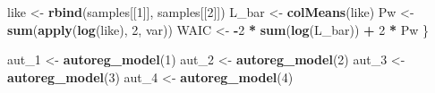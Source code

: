 \documentclass[
]{article}
\newenvironment{Shaded}{\begin{snugshade}}{\end{snugshade}}
\newcommand{\DecValTok}[1]{\textcolor[rgb]{0.00,0.00,0.81}{#1}}
\newcommand{\FunctionTok}[1]{\textcolor[rgb]{0.13,0.29,0.53}{\textbf{#1}}}
\newcommand{\NormalTok}[1]{#1}
\newcommand{\OtherTok}[1]{\textcolor[rgb]{0.56,0.35,0.01}{#1}}
\newcommand{\SpecialCharTok}[1]{\textcolor[rgb]{0.81,0.36,0.00}{\textbf{#1}}}
\begin{document}
\begin{Shaded}
\begin{Highlighting}[]
\NormalTok{  like  }\OtherTok{\textless{}{-}} \FunctionTok{rbind}\NormalTok{(samples[[}\DecValTok{1}\NormalTok{]], samples[[}\DecValTok{2}\NormalTok{]])}
\NormalTok{  L\_bar }\OtherTok{\textless{}{-}} \FunctionTok{colMeans}\NormalTok{(like)}
\NormalTok{  Pw    }\OtherTok{\textless{}{-}} \FunctionTok{sum}\NormalTok{(}\FunctionTok{apply}\NormalTok{(}\FunctionTok{log}\NormalTok{(like), }\DecValTok{2}\NormalTok{, var))}
\NormalTok{  WAIC }\OtherTok{\textless{}{-}} \SpecialCharTok{{-}}\DecValTok{2} \SpecialCharTok{*} \FunctionTok{sum}\NormalTok{(}\FunctionTok{log}\NormalTok{(L\_bar)) }\SpecialCharTok{+} \DecValTok{2} \SpecialCharTok{*}\NormalTok{ Pw}
\NormalTok{\}}

\NormalTok{aut\_1 }\OtherTok{\textless{}{-}} \FunctionTok{autoreg\_model}\NormalTok{(}\DecValTok{1}\NormalTok{)}
\NormalTok{aut\_2 }\OtherTok{\textless{}{-}} \FunctionTok{autoreg\_model}\NormalTok{(}\DecValTok{2}\NormalTok{)}
\NormalTok{aut\_3 }\OtherTok{\textless{}{-}} \FunctionTok{autoreg\_model}\NormalTok{(}\DecValTok{3}\NormalTok{)}
\NormalTok{aut\_4 }\OtherTok{\textless{}{-}} \FunctionTok{autoreg\_model}\NormalTok{(}\DecValTok{4}\NormalTok{)}
\end{Highlighting}
\end{Shaded}
\end{document}
